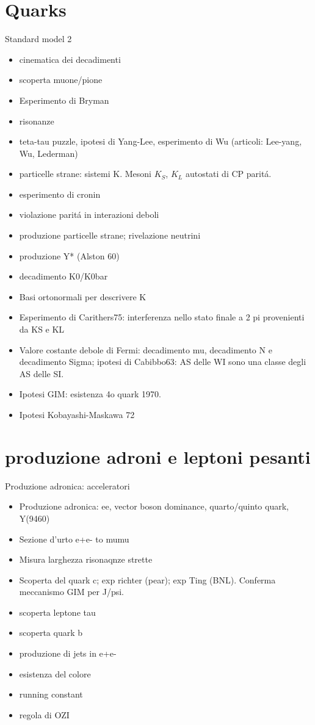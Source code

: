 \documentclass[10pt,xcolor={usenames},fleqn,mathserif,serif]{beamer}
\begin{document}
\part{Quarks}
\begin{wordonframe}{Standard model 2}
\begin{itemize}
\item cinematica dei decadimenti
\item scoperta muone/pione
\item Esperimento di Bryman
\item risonanze
\item teta-tau puzzle, ipotesi di Yang-Lee, esperimento di Wu (articoli: Lee-yang, Wu, Lederman)
\item particelle strane: sistemi K. Mesoni $K_S$, $K_L$ autostati di CP  parit\'a.
\item esperimento di cronin
\item violazione parit\'a in interazioni deboli
\item produzione particelle strane; rivelazione neutrini
\item produzione Y* (Alston 60)
\item decadimento K0/K0bar
\item Basi ortonormali per descrivere K
\item Esperimento di Carithers75: interferenza nello stato finale a 2 pi provenienti da KS e KL
\item Valore costante debole di Fermi: decadimento mu, decadimento N e decadimento Sigma; ipotesi di Cabibbo63: AS delle WI sono una classe degli AS delle SI.
\item Ipotesi GIM: esistenza 4o quark 1970.
\item Ipotesi Kobayashi-Maskawa 72
\end{itemize}
\end{wordonframe}
%

\part{produzione adroni e leptoni pesanti}
\begin{wordonframe}{Produzione adronica: acceleratori}
\begin{itemize}
\item Produzione adronica: ee, vector boson dominance, quarto/quinto quark, Y(9460)
\item  Sezione d'urto e+e- to mumu
\item Misura larghezza risonaqnze strette
\item Scoperta del quark c; exp richter (pear); exp Ting (BNL). Conferma meccanismo GIM per J/psi.
\item scoperta leptone tau
\item scoperta quark b
\item produzione di jets in e+e-
\item esistenza del colore
\item running constant
\item regola di OZI
\end{itemize}
\end{wordonframe}

\end{document}
